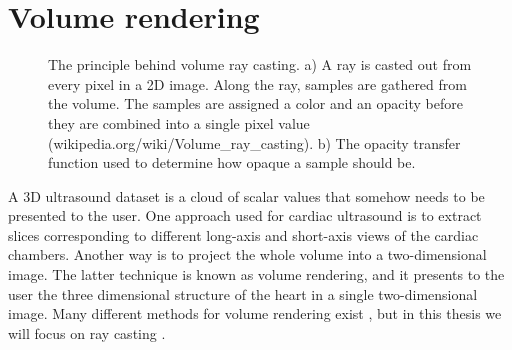 \section{Volume rendering}\label{sec:volren}
\begin{figure}[t!]
\centering
{}
\caption{The principle behind volume ray casting. a) A ray is casted out from every pixel in a 2D image. Along the ray, samples are gathered from the volume. The samples are assigned a color and an opacity before they are combined into a single pixel value (wikipedia.org/wiki/Volume\_ray\_casting). b) The opacity transfer function used to determine how opaque a sample should be.}
\label{fig:vr}
\end{figure}
A 3D ultrasound dataset is a cloud of scalar values that somehow needs to be presented to the user. One approach used for cardiac ultrasound  is to extract slices corresponding to different long-axis and short-axis views of the cardiac chambers. Another way is to project the whole volume into a two-dimensional image. The latter technique is known as volume rendering, and it presents to the user the three dimensional structure of the heart in a single two-dimensional image. Many different methods for volume rendering exist \cite{brodlie2001}, but in this thesis we will focus on ray casting \cite{Levoy1988}. 

